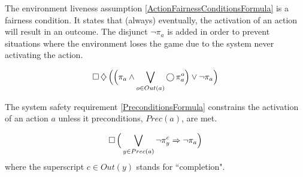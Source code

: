The environment liveness assumption \eqref{ActionFairnessConditionsFormula} is a fairness condition.
It states that (always) eventually, the activation of an action will result in an outcome.
The disjunct $\lnot \pi_a$ is added in order to prevent situations where the environment loses the game due to the system never activating the action.


\begin{equation}\label{ActionFairnessConditionsFormula}
	\operatorname{\Box} \operatorname{\diamondsuit} \Big( \Big( \pi_a \wedge \bigvee \limits_{o \in Out(a)} \operatorname{\bigcirc} \pi_a^o \Big) \vee \lnot \pi_a \Big)
\end{equation}

The system safety requirement \eqref{PreconditionsFormula} constrains the activation of an action $a$ unless it preconditions, $Prec(a)$, are met.

\begin{equation}\label{PreconditionsFormula}
	\operatorname{\Box} \Big( \bigvee \limits_{y \in Prec(a)} \lnot \pi_y^c \Rightarrow \lnot \pi_a \Big)
\end{equation}
where the superscript $c \in Out(y)$ stands for ``completion".

